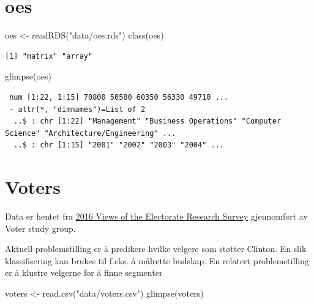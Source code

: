 \documentclass[
  letterpaper,
  DIV=11,
  numbers=noendperiod]{scrreprt}
\newenvironment{Shaded}{\begin{snugshade}}{\end{snugshade}}
\newcommand{\FunctionTok}[1]{\textcolor[rgb]{0.28,0.35,0.67}{#1}}
\newcommand{\NormalTok}[1]{\textcolor[rgb]{0.00,0.23,0.31}{#1}}
\newcommand{\OtherTok}[1]{\textcolor[rgb]{0.00,0.23,0.31}{#1}}
\newcommand{\StringTok}[1]{\textcolor[rgb]{0.13,0.47,0.30}{#1}}
\theoremstyle{definition}
\theoremstyle{remark}
\begin{document}
\hypertarget{oes}{%
\section{oes}\label{oes}}

\begin{Shaded}
\begin{Highlighting}[]
\NormalTok{oes }\OtherTok{\textless{}{-}} \FunctionTok{readRDS}\NormalTok{(}\StringTok{"data/oes.rds"}\NormalTok{)}
\FunctionTok{class}\NormalTok{(oes)}
\end{Highlighting}
\end{Shaded}

\begin{verbatim}
[1] "matrix" "array" 
\end{verbatim}

\begin{Shaded}
\begin{Highlighting}[]
\FunctionTok{glimpse}\NormalTok{(oes)}
\end{Highlighting}
\end{Shaded}

\begin{verbatim}
 num [1:22, 1:15] 70800 50580 60350 56330 49710 ...
 - attr(*, "dimnames")=List of 2
  ..$ : chr [1:22] "Management" "Business Operations" "Computer Science" "Architecture/Engineering" ...
  ..$ : chr [1:15] "2001" "2002" "2003" "2004" ...
\end{verbatim}

\hypertarget{voters}{%
\section{Voters}\label{voters}}

Data er hentet fra \href{https://www.voterstudygroup.org/data}{2016
Views of the Electorate Research Survey} gjennomført av Voter study
group.

Aktuell problemstilling er å predikere hvilke velgere som støtter
Clinton. En slik klassifisering kan brukes til f.eks. å målrette
budskap. En relatert problemstilling er å klustre velgerne for å finne
segmenter

\begin{Shaded}
\begin{Highlighting}[]
\NormalTok{voters }\OtherTok{\textless{}{-}} \FunctionTok{read.csv}\NormalTok{(}\StringTok{"data/voters.csv"}\NormalTok{)}
\FunctionTok{glimpse}\NormalTok{(voters)}
\end{Highlighting}
\end{Shaded}
\end{document}
